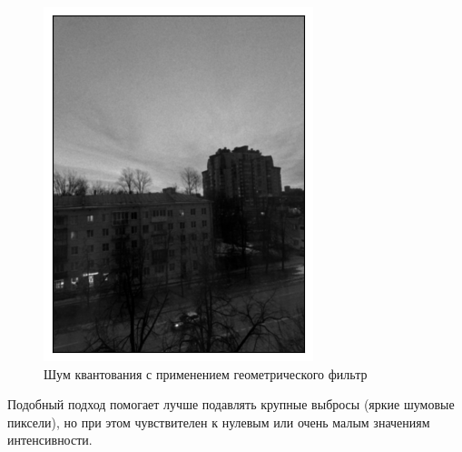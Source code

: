 \documentclass[a4paper,12pt]{article}
\begin{document}
\begin{figure}[H]
\begin{minipage}{0.49\textwidth}
        \centering \includegraphics[width=\textwidth]{results/lpf_pois_2.png}
        \caption{Шум квантования с применением геометрического фильтр}
    \end{minipage}
\end{figure}
\noindent
Подобный подход помогает лучше подавлять крупные выбросы (яркие шумовые пиксели), но при этом чувствителен к нулевым или очень малым значениям интенсивности.
\end{document}
